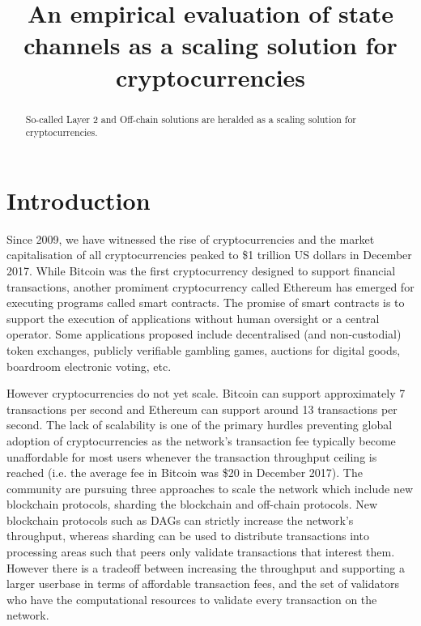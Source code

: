 \documentclass{llncs}
\begin{document}
	\title{An empirical evaluation of state channels as a scaling solution for cryptocurrencies}
	\maketitle
	\begin{abstract}
		So-called Layer 2 and Off-chain solutions are heralded as a scaling solution for cryptocurrencies. 
	\end{abstract} 

\section{Introduction}

Since 2009, we have witnessed the rise of cryptocurrencies and the market capitalisation of all cryptocurrencies peaked to \$1 trillion US dollars in December 2017.
While Bitcoin was the first cryptocurrency designed to support financial transactions, another promiment cryptocurrency called Ethereum has emerged for executing programs called smart contracts. 
The promise of smart contracts is to support the execution of applications without human oversight or a central operator. 
Some applications proposed include decentralised (and non-custodial) token exchanges, publicly verifiable gambling games, auctions for digital goods, boardroom electronic voting, etc. 

However cryptocurrencies do not yet scale. 
Bitcoin can support approximately 7 transactions per second and Ethereum can support around 13 transactions per second. 
The lack of scalability is one of the primary hurdles preventing global adoption of cryptocurrencies as the network's transaction fee typically become unaffordable  for most users whenever the transaction throughput ceiling is reached (i.e. the average fee in Bitcoin was \$20 in December 2017).
The community are pursuing three approaches to scale the network which include new blockchain protocols, sharding the blockchain and off-chain protocols. 
New blockchain protocols such as DAGs can strictly increase the network's throughput, whereas sharding can be used to distribute transactions into processing areas such that peers only validate transactions that interest them. 
However there is a tradeoff between increasing the throughput and supporting a larger userbase in terms of affordable transaction fees, and the set of validators who have the computational resources to validate every transaction on the network.
\end{document}
